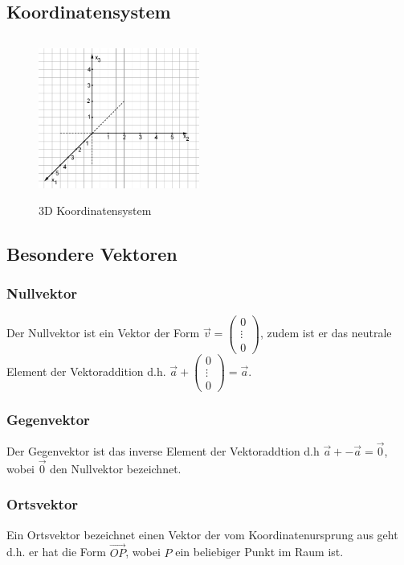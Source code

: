 \documentclass[a4paper]{article} %
\begin{document}
	\subsection{Koordinatensystem}
	\begin{minipage}{0.5\textwidth}
			\begin{figure}[H]
				\includegraphics[width=200px, height=200px]{koordinatensystem.png}
					\captionsetup{labelformat=empty}
				\caption{3D Koordinatensystem}
			\end{figure}
		\end{minipage} 
	\subsection{Besondere Vektoren}
	\subsubsection{Nullvektor}
	Der Nullvektor ist ein Vektor der Form $\vec{v} = \begin{pmatrix} 0 \\ \vdots \\ 0 \end{pmatrix}$, 
	 zudem ist er das neutrale Element der Vektoraddition d.h. $ \vec{a} + \begin{pmatrix} 0 \\ \vdots \\ 0 \end{pmatrix} = \vec{a}$.
	\subsubsection{Gegenvektor}
	Der Gegenvektor ist das inverse Element der Vektoraddtion d.h $ \vec{a}+ -\vec{a}=\vec{0}$, wobei $\vec{0}$ den Nullvektor bezeichnet.
	\subsubsection{Ortsvektor}
	Ein Ortsvektor bezeichnet einen Vektor der vom Koordinatenursprung aus geht d.h. er hat die Form $\vec{OP}$, wobei $P$ ein beliebiger Punkt im Raum ist.
\end{document}
